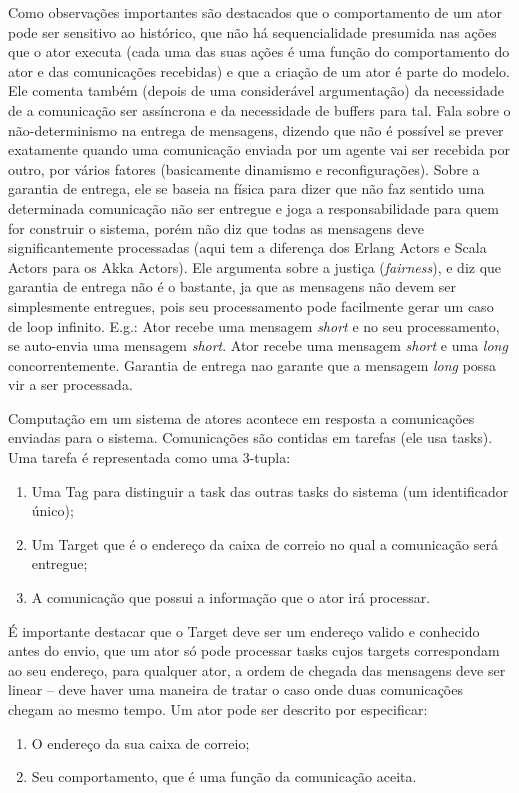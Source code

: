 \documentclass[]{article}
\begin{document}
		\par Como observações importantes são destacados que o comportamento de um ator pode ser sensitivo ao histórico,
		que não há sequencialidade presumida nas ações que o ator executa (cada uma das suas ações é uma função do
		comportamento do ator e das comunicações recebidas) e que a criação de um ator é parte do modelo. Ele comenta
		também (depois de uma considerável argumentação) da necessidade de a comunicação ser assíncrona e da necessidade
		de buffers para tal. Fala sobre o não-determinismo na entrega de mensagens, dizendo que não é possível se prever
		exatamente quando uma comunicação enviada por um agente vai ser recebida por outro, por vários fatores (basicamente
		dinamismo e reconfigurações). Sobre a garantia de entrega, ele se baseia na física para dizer que não faz sentido
		uma determinada comunicação não ser entregue e joga a responsabilidade para quem for construir o sistema, porém não
		diz que todas as mensagens deve significantemente processadas (aqui tem a diferença dos Erlang Actors e Scala Actors
		para os Akka Actors). Ele argumenta sobre a justiça (\textit{fairness}), e diz que garantia de entrega não
		é o bastante, ja que as mensagens não devem ser simplesmente entregues, pois seu processamento pode facilmente
		gerar um caso de loop infinito. E.g.: Ator recebe uma mensagem \emph{short} e no seu processamento, se auto-envia
		uma mensagem \emph{short}. Ator recebe uma mensagem \emph{short} e uma \emph{long} concorrentemente. Garantia
		de entrega nao garante que a mensagem \emph{long} possa vir a ser processada.\\
		
		\par Computação em um sistema de atores acontece em resposta a comunicações enviadas para o sistema. Comunicações
		são contidas em tarefas (ele usa tasks). Uma tarefa é representada como uma 3-tupla:
		\begin{enumerate}
			\item Uma Tag para distinguir a task das outras tasks do sistema (um identificador único);
			\item Um Target que é o endereço da caixa de correio no qual a comunicação será entregue;
			\item A comunicação que possui a informação que o ator irá processar.			
		\end{enumerate}		

		\par É importante destacar que o Target deve ser um endereço valido e conhecido antes do envio, que um ator só
		pode processar tasks cujos targets correspondam ao seu endereço, para qualquer ator, a ordem de chegada das
		mensagens deve ser linear -- deve haver uma maneira de tratar o caso onde duas comunicações chegam ao mesmo
		tempo. Um ator pode ser descrito por especificar:
		\begin{enumerate}
			\item O endereço da sua caixa de correio;
			\item Seu comportamento, que é uma função da comunicação aceita.
		\end{enumerate}
		
\end{document}
